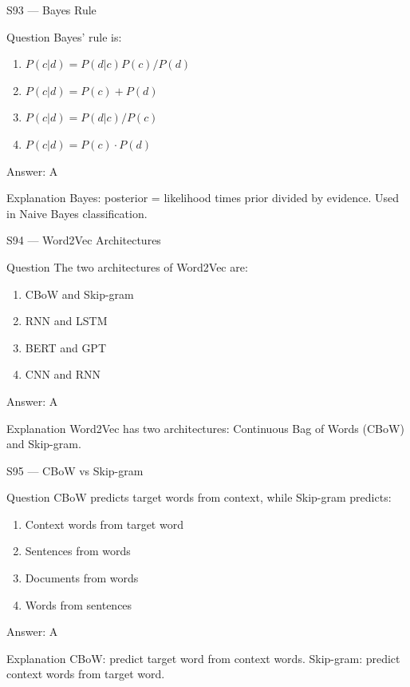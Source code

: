 \documentclass[aspectratio=169,8pt]{beamer}
\begin{document}
	\begin{frame}{S93 --- Bayes Rule}
		\begin{block}{Question}
			Bayes' rule is:
			\begin{enumerate}
				\item $P(c|d) = P(d|c)P(c)/P(d)$
				\item $P(c|d) = P(c) + P(d)$
				\item $P(c|d) = P(d|c)/P(c)$
				\item $P(c|d) = P(c) \cdot P(d)$
			\end{enumerate}
		\end{block}
		\begin{exampleblock}{Answer: A}\end{exampleblock}
		\begin{block}{Explanation}
			Bayes: posterior = likelihood times prior divided by evidence. Used in Naive Bayes classification.
		\end{block}
	\end{frame}
	
	\begin{frame}{S94 --- Word2Vec Architectures}
		\begin{block}{Question}
			The two architectures of Word2Vec are:
			\begin{enumerate}
				\item CBoW and Skip-gram
				\item RNN and LSTM
				\item BERT and GPT
				\item CNN and RNN
			\end{enumerate}
		\end{block}
		\begin{exampleblock}{Answer: A}\end{exampleblock}
		\begin{block}{Explanation}
			Word2Vec has two architectures: Continuous Bag of Words (CBoW) and Skip-gram.
		\end{block}
	\end{frame}
	
	\begin{frame}{S95 --- CBoW vs Skip-gram}
		\begin{block}{Question}
			CBoW predicts target words from context, while Skip-gram predicts:
			\begin{enumerate}
				\item Context words from target word
				\item Sentences from words
				\item Documents from words
				\item Words from sentences
			\end{enumerate}
		\end{block}
		\begin{exampleblock}{Answer: A}\end{exampleblock}
		\begin{block}{Explanation}
			CBoW: predict target word from context words. Skip-gram: predict context words from target word.
		\end{block}
	\end{frame}
	
\end{document}
